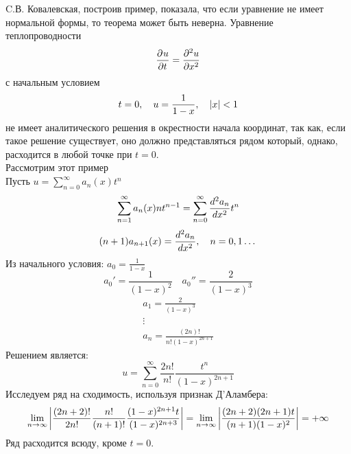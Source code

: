 	C.В. Ковалевская, построив пример, показала, что если уравнение не имеет нормальной формы, то теорема может быть неверна. Уравнение теплопроводности 
		\[
			\frac{\partial^{}u}{\partial t^{}} = \frac{\partial^{2}u}{\partial x^{2}}
		\]
		с начальным условием 
		\[ 
			t=0, \quad u = \frac{1}{1 - x}, \quad \left | x \right | < 1
		\] 
		не имеет аналитического решения в окрестности начала координат, так как, если такое решение существует, оно должно представляться рядом который, однако, расходится в любой точке при $t = 0$.\\

		Рассмотрим этот пример\\

		Пусть $u = \sum\limits_{n = 0}^{\infty} a_n (x) t^n$\\
		\[
			\sum\limits_{n = 1}^{\infty} a_n (x) n t^{n - 1} = \sum\limits_{n = 0}^{\infty} \frac{d^{2}a_n}{dx^{2}} t^n
		\]
		\[
			(n + 1) a_{n + 1} (x) = \frac{d^{2}a_n}{dx^{2}}, \quad n = 0,1 \dots
		\]
		Из начального условия: $a_0 = \frac{1}{1 -x}$\\
		\[
			a_0' = \frac{1}{(1 - x)^2} \quad a_0'' = \frac{2}{(1 - x)^3}
		\]
		\[
			\begin{matrix}
				a_1 = \frac{2}{(1 - x)^3}\\
				\vdots\\
				a_n = \frac{(2n)!}{n! (1 - x)^{2n + 1}}
			\end{matrix}
		\]
		Решением является:
		\[
			u = \sum\limits_{n = 0}^{\infty} \frac{2n!}{n!} \frac{t^n}{(1 - x)^{2n+1}}
		\]
		Исследуем ряд на сходимость, используя признак Д'Аламбера:
		\[
			\lim\limits_{n \rightarrow \infty} \left | \frac{(2n + 2)!}{2n!} \frac{n!}{(n + 1)!} \frac{(1 - x)^{2n + 1} t}{(1 - x)^{2n + 3}} \right | = \lim\limits_{n \rightarrow \infty} \left | \frac{(2n + 2) (2n + 1) t}{(n + 1)(1 - x)^2} \right | = + \infty
		\]
		Ряд расходится всюду, кроме $t = 0$. 
		 
		
